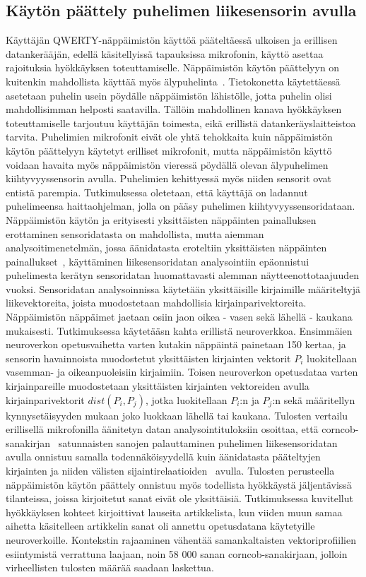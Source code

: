 \documentclass[finnish]{tktltiki2}
\theoremstyle{definition}
\theoremstyle{remark}
\begin{document}
\subsection{Käytön päättely puhelimen liikesensorin avulla}
Käyttäjän QWERTY-näppäimistön käyttöä pääteltäessä ulkoisen ja erillisen datankerääjän, edellä käsitellyissä tapauksissa mikrofonin, käyttö asettaa rajoituksia hyökkäyksen toteuttamiselle. Näppäimistön käytön päättelyyn on kuitenkin mahdollista käyttää myös älypuhelinta~\cite{mar}. Tietokonetta käytettäessä asetetaan puhelin usein pöydälle näppäimistön lähistölle, jotta puhelin olisi mahdollisimman helposti saatavilla. Tällöin mahdollinen kanava hyökkäyksen toteuttamiselle tarjoutuu käyttäjän toimesta, eikä erillistä datankeräyslaitteistoa tarvita. Puhelimien mikrofonit eivät ole yhtä tehokkaita kuin näppäimistön käytön päättelyyn käytetyt erilliset mikrofonit, mutta näppäimistön käyttö voidaan havaita myös näppäimistön vieressä pöydällä olevan älypuhelimen kiihtyvyyssensorin avulla. Puhelimien kehittyessä myös niiden sensorit ovat entistä parempia. 
Tutkimuksessa oletetaan, että käyttäjä on ladannut puhelimeensa haittaohjelman, jolla on pääsy puhelimen kiihtyvyyssensoridataan. Näppäimistön käytön ja erityisesti yksittäisten näppäinten painalluksen erottaminen sensoridatasta on mahdollista, mutta aiemman analysoitimenetelmän, jossa äänidatasta eroteltiin yksittäisten näppäinten painallukset~\cite{aso}, käyttäminen liikesensoridatan analysointiin epäonnistui puhelimesta kerätyn sensoridatan huomattavasti alemman näytteenottotaajuuden vuoksi. Sensoridatan analysoinnissa  käytetään yksittäisille kirjaimille määriteltyjä liikevektoreita, joista muodostetaan mahdollisia kirjainparivektoreita. Näppäimistön näppäimet jaetaan osiin jaon oikea - vasen sekä lähellä - kaukana mukaisesti. Tutkimuksessa käytetääsn kahta erillistä neuroverkkoa. Ensimmäien neuroverkon opetusvaihetta varten kutakin näppäintä painetaan 150 kertaa, ja sensorin havainnoista muodostetut yksittäisten kirjainten vektorit $P_i$ luokitellaan vasemman- ja oikeanpuoleisiin kirjaimiin. Toisen neuroverkon opetusdataa varten kirjainpareille muodostetaan yksittäisten kirjainten vektoreiden avulla kirjainparivektorit $dist(P_i,P_j)$, jotka luokitellaan $P_i$:n ja $P_j$:n sekä määritellyn kynnysetäisyyden mukaan joko luokkaan lähellä tai kaukana. Tulosten vertailu erillisellä mikrofonilla äänitetyn datan analysointituloksiin osoittaa, että corncob-sanakirjan~\cite{corn} satunnaisten sanojen palauttaminen puhelimen liikesensoridatan avulla onnistuu samalla todennäköisyydellä kuin äänidatasta pääteltyjen kirjainten ja niiden välisten sijaintirelaatioiden~\cite{berger} avulla. Tulosten perusteella näppäimistön käytön päättely onnistuu myös todellista hyökkäystä jäljentävissä tilanteissa, joissa kirjoitetut sanat eivät ole yksittäisiä. Tutkimuksessa kuvitellut hyökkäyksen kohteet kirjoittivat lauseita artikkelista, kun viiden muun samaa aihetta käsitelleen artikkelin sanat oli annettu opetusdatana käytetyille neuroverkoille. Kontekstin rajaaminen vähentää samankaltaisten vektoriprofiilien esiintymistä verrattuna laajaan, noin 58 000 sanan corncob-sanakirjaan, jolloin virheellisten tulosten määrää saadaan laskettua. \linebreak \linebreak
 
\end{document}
